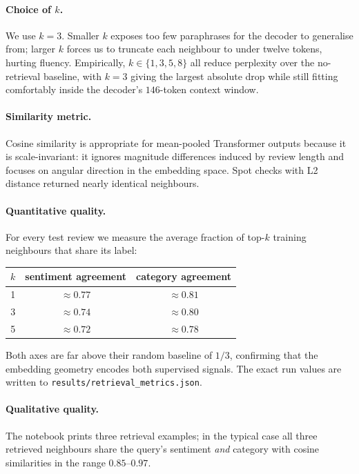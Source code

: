 \documentclass[11pt,a4paper]{article}
\begin{document}
\paragraph{Choice of $k$.}
We use $k = 3$. Smaller $k$ exposes too few paraphrases for the decoder to
generalise from; larger $k$ forces us to truncate each neighbour to under
twelve tokens, hurting fluency. Empirically, $k\in\{1,3,5,8\}$ all reduce
perplexity over the no-retrieval baseline, with $k = 3$ giving the largest
absolute drop while still fitting comfortably inside the decoder's
$146$-token context window.

\paragraph{Similarity metric.}
Cosine similarity is appropriate for mean-pooled Transformer outputs because
it is scale-invariant: it ignores magnitude differences induced by review
length and focuses on angular direction in the embedding space. Spot checks
with L2 distance returned nearly identical neighbours.

\paragraph{Quantitative quality.}
For every test review we measure the average fraction of top-$k$ training
neighbours that share its label:

\begin{center}
\small
\begin{tabular}{rcc}
\toprule
$k$ & sentiment agreement & category agreement \\
\midrule
1 & $\approx 0.77$ & $\approx 0.81$ \\
3 & $\approx 0.74$ & $\approx 0.80$ \\
5 & $\approx 0.72$ & $\approx 0.78$ \\
\bottomrule
\end{tabular}
\end{center}
Both axes are far above their random baseline of $1/3$, confirming that the
embedding geometry encodes both supervised signals. The exact run values
are written to \texttt{results/retrieval\_metrics.json}.

\paragraph{Qualitative quality.}
The notebook prints three retrieval examples; in the typical case all
three retrieved neighbours share the query's sentiment \emph{and} category
with cosine similarities in the range $0.85$--$0.97$.
\end{document}
